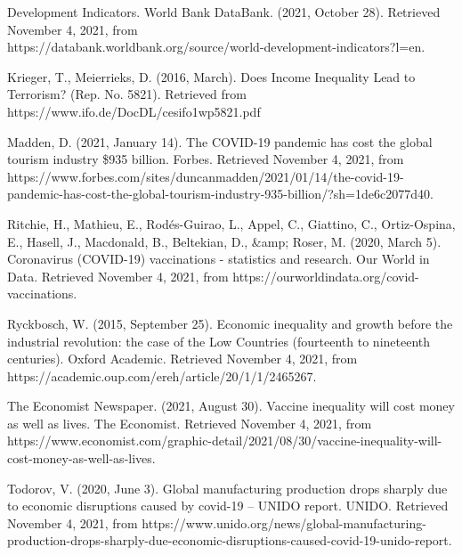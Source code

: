 \documentclass[fontsize=11pt]{article}
\begin{document}
    \item Development Indicators. World Bank DataBank. (2021, October 28). Retrieved November 4, 2021, from \\ \indent https://databank.worldbank.org/source/world-development-indicators?l=en. \\

    \item Krieger, T.,  Meierrieks, D. (2016, March).  Does Income Inequality Lead to Terrorism?  (Rep.  No.  5821). Retrieved \indent from https://www.ifo.de/DocDL/cesifo1wp5821.pdf \\

    \item Madden, D. (2021, January 14). The COVID-19 pandemic has cost the global tourism industry \$935 billion. \indent Forbes. Retrieved November 4, 2021, \indent from https://www.forbes.com/sites/duncanmadden/2021/01/14/the-\indent covid-19-pandemic-has-cost-the-global-tourism-industry-935-billion/?sh=1de6c2077d40. \\

    \item Ritchie, H., Mathieu, E., Rodés-Guirao, L., Appel, C., Giattino, C., Ortiz-Ospina, E., Hasell, J., Macdonald, B., \indent Beltekian, D., &amp; Roser, M. (2020, March 5). Coronavirus (COVID-19) vaccinations - statistics and research. \indent Our World in Data. Retrieved November 4, 2021, from https://ourworldindata.org/covid-vaccinations. \\

    \item Ryckbosch, W. (2015, September 25). Economic inequality and growth before the industrial revolution: the case \indent of the Low Countries (fourteenth to nineteenth centuries). Oxford Academic. Retrieved November 4, 2021, from \indent https://academic.oup.com/ereh/article/20/1/1/2465267. \\

    \item The Economist Newspaper. (2021, August 30). Vaccine inequality will cost money as well as lives. The Economist. \indent Retrieved November 4, 2021, from https://www.economist.com/graphic-detail/2021/08/30/vaccine-inequality-\indent will-cost-money-as-well-as-lives. \\

    \item Todorov, V. (2020, June 3). Global manufacturing production drops sharply due to economic disruptions caused \indent by covid-19 – UNIDO report. UNIDO. Retrieved November 4, 2021, from https://www.unido.org/news/global-\indent manufacturing-production-drops-sharply-due-economic-disruptions-caused-covid-19-unido-report. \\
\end{document}

